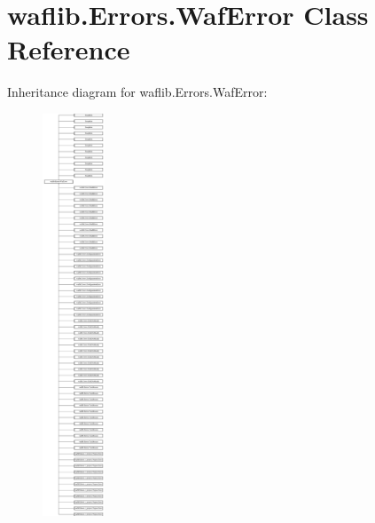 \hypertarget{classwaflib_1_1_errors_1_1_waf_error}{}\section{waflib.\+Errors.\+Waf\+Error Class Reference}
\label{classwaflib_1_1_errors_1_1_waf_error}
Inheritance diagram for waflib.\+Errors.\+Waf\+Error\+:\begin{figure}[H]
\begin{center}
\leavevmode
\includegraphics[height=12.000000cm]{classwaflib_1_1_errors_1_1_waf_error}
\end{center}
\end{figure}

